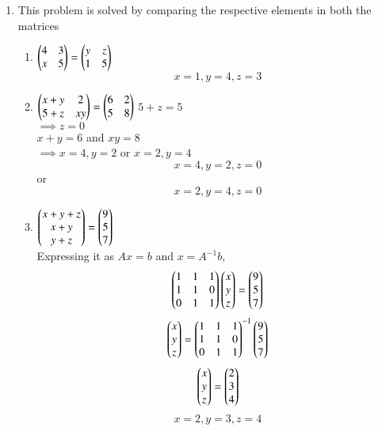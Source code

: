 \renewcommand{\theequation}{\theenumi}
\begin{enumerate}[label=\arabic*.,ref=\thesubsubsection.\theenumi]
%
\item This problem is solved by comparing the respective elements in both the matrices
\begin{enumerate}
\item $\begin{pmatrix}4&3\\x&5\end{pmatrix} = \begin{pmatrix}y&z\\1&5\end{pmatrix}$
$$x=1, y=4, z=3$$
\item $\begin{pmatrix}x+y&2\\5+z&xy\end{pmatrix} = \begin{pmatrix}6&2\\5&8\end{pmatrix}$
$5+z = 5$ \\
$\implies z=0$ \\
$x+y=6$ and $xy=8$ \\
$\implies x=4,y=2$ or $x=2,y=4$
$$x=4, y=2, z=0$$ or $$x=2, y=4, z=0$$  
\item $\begin{pmatrix}x+y+z\\x+y\\y+z\end{pmatrix} = \begin{pmatrix}9\\5\\7\end{pmatrix}$ \\
Expressing it as $Ax = b$ and $x = A^{-1}b$, \\
$$\begin{pmatrix}1&1&1\\1&1&0\\0&1&1\end{pmatrix}\begin{pmatrix}x\\y\\z\end{pmatrix} = \begin{pmatrix}9\\5\\7\end{pmatrix}$$
$$\begin{pmatrix}x\\y\\z\end{pmatrix} = \begin{pmatrix}1&1&1\\1&1&0\\0&1&1\end{pmatrix}^{-1}\begin{pmatrix}9\\5\\7\end{pmatrix}$$
$$\begin{pmatrix}x\\y\\z\end{pmatrix} = \begin{pmatrix}2\\3\\4\end{pmatrix}$$
$$x=2, y=3, z=4$$
\end{enumerate}
\end{enumerate}

